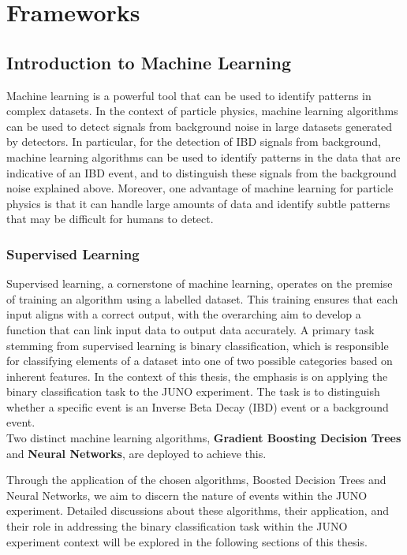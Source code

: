 \chapter{Frameworks}
\section{Introduction to Machine Learning}

Machine learning is a powerful tool that can be used to identify patterns in complex datasets. In the context of particle physics, machine learning algorithms can be used to detect signals from background noise in large datasets generated by detectors. In particular, for the detection of IBD signals from background, machine learning algorithms can be used to identify patterns in the data that are indicative of an IBD event, and to distinguish these signals from the background noise explained above. Moreover, one advantage of machine learning for particle physics is that it can handle large amounts of data and identify subtle patterns that may be difficult for humans to detect.


\subsection{Supervised Learning}
Supervised learning, a cornerstone of machine learning, operates on the premise of training an algorithm using a labelled dataset. This training ensures that each input aligns with a correct output, with the overarching aim to develop a function that can link input data to output data accurately. A primary task stemming from supervised learning is binary classification, which is responsible for classifying elements of a dataset into one of two possible categories based on inherent features. In the context of this thesis, the emphasis is on applying the binary classification task to the JUNO experiment. The task is to distinguish whether a specific event is an Inverse Beta Decay (IBD) event or a background event.\\
 
Two distinct machine learning algorithms, \textbf{Gradient Boosting Decision Trees} and \textbf{Neural Networks}, are deployed to achieve this.

Through the application of the chosen algorithms, Boosted Decision Trees and Neural Networks, we aim to discern the nature of events within the JUNO experiment. Detailed discussions about these algorithms, their application, and their role in addressing the binary classification task within the JUNO experiment context will be explored in the following sections of this thesis.

